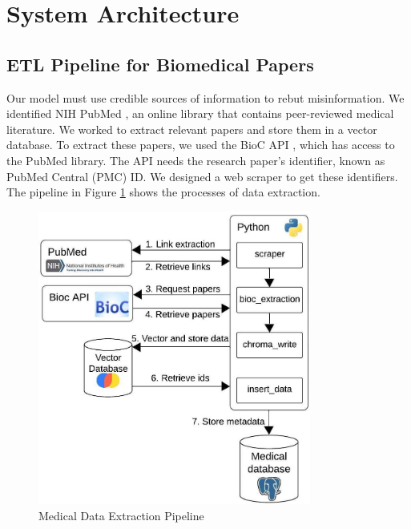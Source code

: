 
\section{System Architecture}


\subsection{ETL Pipeline for Biomedical Papers}

Our model must use credible sources of information to rebut misinformation. We identified NIH PubMed \cite{pubmed}, an online library that contains peer-reviewed medical literature. We worked to extract relevant papers and store them in a vector database. To extract these papers, we used the BioC API \cite{bioinformatics}, which has access to the PubMed library. The API needs the research paper's identifier, known as PubMed Central (PMC) ID. We designed a web scraper to get these identifiers. The pipeline in Figure \ref{fig:etl} shows the processes of data extraction. 

\begin{figure}[!htb]
	\begin{center}
		\includegraphics[width=0.8\textwidth]{figures/ETL_Pipeline.jpeg} %
	\end{center}
	\caption{Medical Data Extraction Pipeline} %
	\label{fig:etl}
\end{figure}

